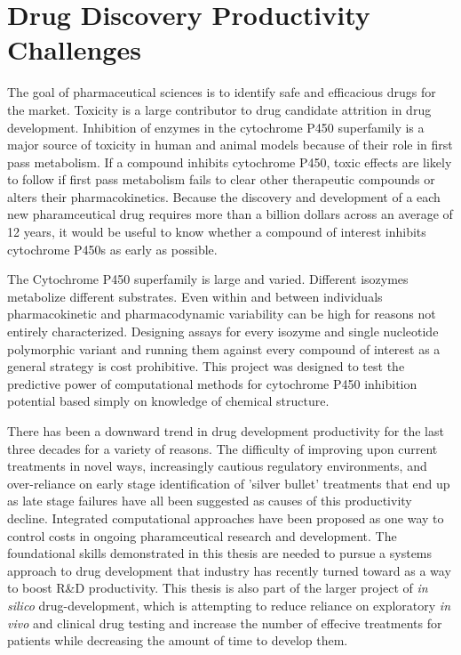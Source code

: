 
\section{Drug Discovery Productivity Challenges}

The goal of pharmaceutical sciences is to identify safe and efficacious drugs for the market. Toxicity is a large contributor to drug candidate attrition in drug development. Inhibition of enzymes in the cytochrome P450 superfamily is a major source of toxicity in human and animal models because of their role in first pass metabolism. If a compound inhibits cytochrome P450, toxic effects are likely to follow if first pass metabolism fails to clear other therapeutic compounds or alters their pharmacokinetics. Because the discovery and development of a each new pharamceutical drug requires more than a billion dollars across an average of 12 years, it would be useful to know whether a compound of interest inhibits cytochrome P450s as early as possible.

The Cytochrome P450 superfamily is large and varied. Different isozymes metabolize different substrates. Even within and between individuals pharmacokinetic and pharmacodynamic variability can be high for reasons not entirely characterized. Designing assays for every isozyme and single nucleotide polymorphic variant and running them against every compound of interest as a general strategy is cost prohibitive. This project was designed to test the predictive power of computational methods for cytochrome P450 inhibition potential based simply on knowledge of chemical structure.

There has been a downward trend in drug development productivity for the last three decades for a variety of reasons. The difficulty of improving upon current treatments in novel ways, increasingly cautious regulatory environments, and over-reliance on early stage identification of 'silver bullet' treatments that end up as late stage failures have all been suggested as causes of this productivity decline.  \cite{Scannell2012} Integrated computational approaches have been proposed as one way to control costs in ongoing pharamceutical research and development. \cite{Visser2014} The foundational skills demonstrated in this thesis are needed to pursue a systems approach to drug development that industry has recently turned toward as a way to boost R\&D productivity. \cite{Berg2014} This thesis is also part of the larger project of \textit{in silico} drug-development, which is attempting to reduce reliance on exploratory \textit{in vivo} and clinical drug testing and increase the number of effecive treatments for patients while decreasing the amount of time to develop them.

